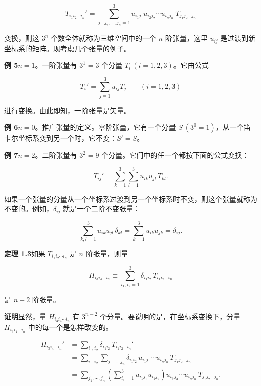 \begin{equation}
T_{i_1 i_2 \cdots i_n}' = \sum_{j_1, j_2, \cdots, j_n = 1}^{3} u_{i_1 j_1} u_{i_2 j_2} \cdots u_{i_n j_n}\, T_{j_1 j_2 \cdots j_n}
\tag{1.21}
\end{equation}

变换，则这 $3^{n}$ 个数全体就称为三维空间中的一个 $n$ 阶张量，这里 $u_{ij}$ 是过渡到新坐标系的矩阵。现考虑几个张量的例子。

\textbf{例 5}\quad $n = 1$。一阶张量有 $3^{1} = 3$ 个分量 $T_i\ (i = 1, 2, 3)$。它由公式

\begin{equation*}
T_i' = \sum_{j=1}^{3} u_{ij} T_j \qquad (i = 1, 2, 3)
\end{equation*}

进行变换。由此即知，一阶张量是矢量。

\textbf{例 6}\quad $n = 0$。推广张量的定义。零阶张量，它有一个分量 $S\ (3^{0} = 1)$，从一个笛卡尔坐标系变到另一个时，它不变：$S' = S$。

\textbf{例 7}\quad $n = 2$。二阶张量有 $3^{2} = 9$ 个分量。它们中的任一个都按下面的公式变换：

\begin{equation*}
T_{ij}' = \sum_{k=1}^{3} \sum_{l=1}^{3} u_{ik} u_{jl}\, T_{kl}.
\end{equation*}

如果一个张量的分量从一个坐标系过渡到另一个坐标系时不变，则这个张量就称为不变的。例如，$\delta_{ij}$ 就是一个二阶不变张量：

\begin{equation*}
\sum_{k,l=1}^{3} u_{ik} u_{jl}\, \delta_{kl} = \sum_{k=1}^{3} u_{ik} u_{jk} = \delta_{ij}.
\end{equation*}

\textbf{定理 1.3}\quad 如果 $T_{i_1 i_2 \cdots i_n}$ 是 $n$ 阶张量，则量

\begin{equation*}
H_{i_3 i_4 \cdots i_n} \equiv \sum_{i_1, i_2 = 1}^{3} \delta_{i_1 i_2}\, T_{i_1 i_2 \cdots i_n}
\end{equation*}

是 $n - 2$ 阶张量。

\textbf{证明}\quad 显然，量 $H_{i_3 i_4 \cdots i_n}$ 有 $3^{n-2}$ 个分量。要说明的是，在坐标系变换下，分量 $H_{i_3 i_4 \cdots i_n}$ 中的每一个是怎样改变的。

\begin{equation*}
\begin{aligned}
H_{i_3 i_4 \cdots i_n}' &= \sum_{i_1, i_2} \delta_{i_1 i_2}\, T_{i_1 i_2 \cdots i_n}'\\
&= \sum_{i_1, i_2} \sum_{j_1, \cdots, j_n} \delta_{i_1 i_2}\, u_{i_1 j_1} \cdots u_{i_n j_n}\, T_{j_1 j_2 \cdots j_n}\\
&= \sum_{j_1, \cdots, j_n} \left(\sum_{i_1 = 1}^{3} u_{i_1 j_1} u_{i_1 j_2}\right) u_{i_3 j_3} \cdots u_{i_n j_n}\, T_{j_1 j_2 \cdots j_n}.
\end{aligned}
\end{equation*}

